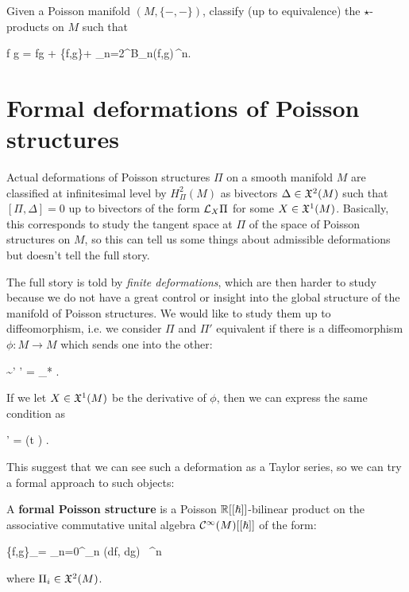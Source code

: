 \documentclass[main.tex]{subfiles}
\begin{document}
\begin{problem*}
	Given a Poisson manifold $(M, \{-,-\})$, classify (up to equivalence) the $\star$-products on $M$ such that
	\begin{eqalign}
		f \star g = fg + \{f,g\}\planck + \sum_{n=2}^\infty B_n(f,g)\,\planck^n.
	\end{eqalign}
\end{problem*}

\section{Formal deformations of Poisson structures}
Actual deformations of Poisson structures $\Pi$ on a smooth manifold $M$ are classified at infinitesimal level by $H^2_\Pi(M)$ as bivectors $\Delta \in \mathfrak{X}^2(M)$ such that $[\Pi,\Delta]=0$ up to bivectors of the form $\mathcal{L}_{X} \Pi$ for some $X \in \mathfrak{X}^1(M)$. Basically, this corresponds to study the tangent space at $\Pi$ of the space of Poisson structures on $M$, so this can tell us some things about admissible deformations but doesn't tell the full story.

The full story is told by \emph{\issue finite deformations}, which are then harder to study because we do not have a great control or insight into the global structure of the manifold of Poisson structures. We would like to study them up to diffeomorphism, i.e. we consider $\Pi$ and $\Pi'$ equivalent if there is a diffeomorphism $\phi : M \to M$ which sends one into the other:
\begin{eqalign}
	\Pi \sim \Pi' \iff \Pi' = \phi_* \Pi.
\end{eqalign}
If we let $X \in \mathfrak{X}^1(M)$ be the derivative of $\phi$, then we can express the same condition as
\begin{eqalign}
	\Pi' = \exp(t ) \Pi.
\end{eqalign}
This suggest that we can see such a deformation as a Taylor series, so we can try a formal approach to such objects:

\begin{definition}
	A \textbf{formal Poisson structure} is a Poisson $\mathbb{R}[[{\boldsymbol\hslash}]]$-bilinear product on the associative commutative unital algebra $\mathcal{C}^\infty(M)[[{\boldsymbol\hslash}]]$ of the form:
	\begin{eqalign}
		\{f,g\}_\planck = \sum_{n=0}^\infty \Pi_n (df, dg) \, \planck^n
	\end{eqalign}
	where $\Pi_i \in \mathfrak{X}^2(M)$.
\end{definition}
\end{document}
